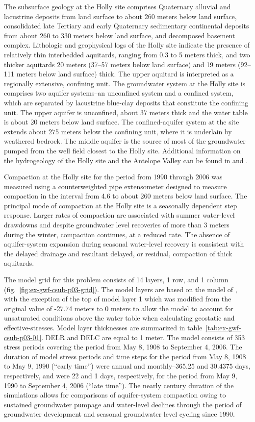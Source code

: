 The subsurface geology at the Holly site comprises Quaternary alluvial and lacustrine deposits from land surface to about 260 meters below land surface, consolidated late Tertiary and early Quaternary sedimentary continental deposits from about 260 to 330 meters below land surface, and decomposed basement complex. Lithologic and geophysical logs of the Holly site indicate the presence of relatively thin interbedded aquitards, ranging from 0.3 to 5 meters thick, and two thicker aquitards 20 meters (37--57 meters below land surface) and 19 meters (92--111 meters below land surface) thick. The upper aquitard is interpreted as a regionally extensive, confining unit. The groundwater system at the Holly site is comprises two aquifer systems--an unconfined system and a confined system, which are separated by lacustrine blue-clay deposits that constitute the confining unit. The upper aquifer is unconfined, about 37 meters thick and the water table is about 20 meters below land surface. The confined-aquifer system at the site extends about 275 meters below the confining unit, where it is underlain by weathered bedrock. The middle aquifer is the source of most of the groundwater pumped from the well field closest to the Holly site. Additional information on the hydrogeology of the Holly site and the Antelope Valley can be found in \cite{sneed2000aquifer} and  \cite{sneed2008}.

Compaction at the Holly site for the period from 1990 through 2006 was measured using a counterweighted pipe extensometer designed to measure compaction in the interval from 4.6 to about 260 meters below land surface. The principal mode of compaction at the Holly site is a seasonally dependent step response. Larger rates of compaction are associated with summer water-level drawdowns and despite groundwater level recoveries of more than 3 meters during the winter, compaction continues, at a reduced rate. The absence of aquifer-system expansion during seasonal water-level recovery is consistent with the delayed drainage and resultant delayed, or residual, compaction of thick aquitards.

The model grid for this problem consists of 14 layers, 1 row, and 1 column (fig.~\ref{fig:ex-gwf-csub-p03-grid}). The model layers are based on the model of \cite{sneed2008}, with the exception of the top of model layer 1 which was modified from the original value of -27.74 meters to 0 meters to allow the model to account for unsaturated conditions above the water table when calculating geostatic and effective-stresses. Model layer thicknesses are summarized in table~\ref{tab:ex-gwf-csub-p03-01}. DELR and DELC are equal to 1 meter. The model consists of 353 stress periods covering the period from May 8, 1908 to September 4, 2006. The duration of model stress periods and time steps for the period from May 8, 1908 to May 9, 1990 (“early time”) were annual and monthly--365.25 and 30.4375 days, respectively, and were 22 and 1 days, respectively, for the period from May 9, 1990 to September 4, 2006 (“late time”). The nearly century duration of the simulations allows for comparisons of aquifer-system compaction owing to sustained groundwater pumpage and water-level declines through the period of groundwater development and seasonal groundwater level cycling since 1990.

